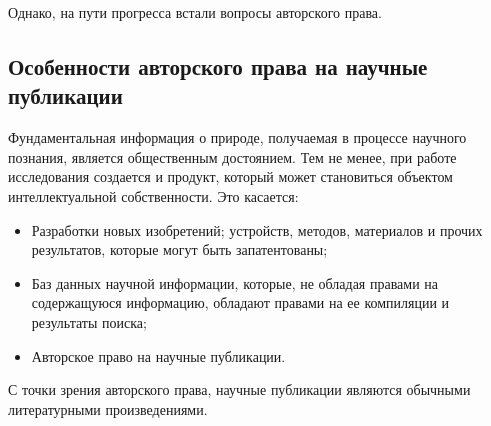 \documentclass[10pt, a5paper]{article}
\begin{document}
Однако, на пути прогресса встали вопросы авторского права.

\subsection*{Особенности авторского права на научные публикации}

Фундаментальная информация о природе, получаемая в процессе научного познания, является общественным достоянием. Тем не менее, при работе исследования создается и продукт, который может становиться объектом интеллектуальной собственности. Это касается:
\begin{itemize}
  \item Разработки новых изобретений; устройств, методов, материалов и прочих результатов, которые могут быть запатентованы;
  \item Баз данных научной информации, которые, не обладая правами на содержащуюся информацию, обладают правами на ее компиляции и результаты поиска;
  \item Авторское право на научные публикации.
\end{itemize}

С точки зрения авторского права, научные публикации являются обычными литературными произведениями.
\end{document}
